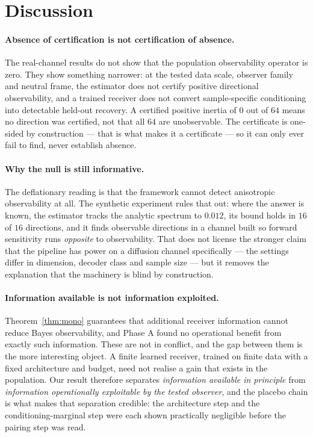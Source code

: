 \documentclass{article}
\theoremstyle{definition}
\begin{document}
\section{Discussion}

\paragraph{Absence of certification is not certification of absence.}
The real-channel results do not show that the population observability operator is zero.
They show something narrower: at the tested data scale, observer family and neutral
frame, the estimator does not certify positive directional observability, and a trained
receiver does not convert sample-specific conditioning into detectable held-out recovery.
A certified positive inertia of $0$ out of $64$ means no direction was certified, not that
all $64$ are unobservable. The certificate is one-sided by construction --- that is what
makes it a certificate --- so it can only ever fail to find, never establish absence.

\paragraph{Why the null is still informative.}
The deflationary reading is that the framework cannot detect anisotropic observability at
all. The synthetic experiment rules that out: where the answer is known, the estimator
tracks the analytic spectrum to $0.012$, its bound holds in $16$ of $16$ directions, and
it finds observable directions in a channel built so forward sensitivity runs
\emph{opposite} to observability. That does not license the stronger claim that the
pipeline has power on a diffusion channel specifically --- the settings differ in
dimension, decoder class and sample size --- but it removes the explanation that the
machinery is blind by construction.

\paragraph{Information available is not information exploited.}
Theorem~\ref{thm:mono} guarantees that additional receiver information cannot reduce
Bayes observability, and Phase A found no operational benefit from exactly such
information. These are not in conflict, and the gap between them is the more interesting
object. A finite learned receiver, trained on finite data with a fixed architecture and
budget, need not realise a gain that exists in the population. Our result therefore
separates \emph{information available in principle} from \emph{information operationally
exploitable by the tested observer}, and the placebo chain is what makes that separation
credible: the architecture step and the conditioning-marginal step were each shown
practically negligible before the pairing step was read.
\end{document}
